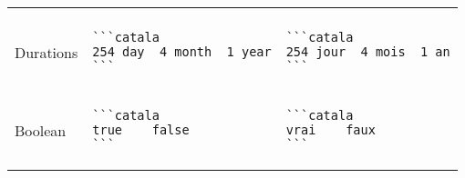 \documentclass[a3paper,landscape]{article}
\begin{document}
\begin{multicols*}{2}
\begin{center}
\begin{tabular}{p{}p{}p{}}
\vspace*{-1.75em}
\\
Durations&
\vspace*{-1.75em}
\begin{verbatim}
```catala
254 day  4 month  1 year
```
\end{verbatim}
\vspace*{-1.75em}
&
\vspace*{-1.75em}
\begin{verbatim}
```catala
254 jour  4 mois  1 an
```
\end{verbatim}
\vspace*{-1.75em}
\\
Boolean&
\vspace*{-1.75em}
\begin{verbatim}
```catala
true    false
```
\end{verbatim}
\vspace*{-1.75em}
&
\vspace*{-1.75em}
\begin{verbatim}
```catala
vrai    faux
```
\end{verbatim}
\vspace*{-1.75em}
\\
\bottomrule
\end{tabular}
\end{center}






\end{multicols*}
\end{document}
